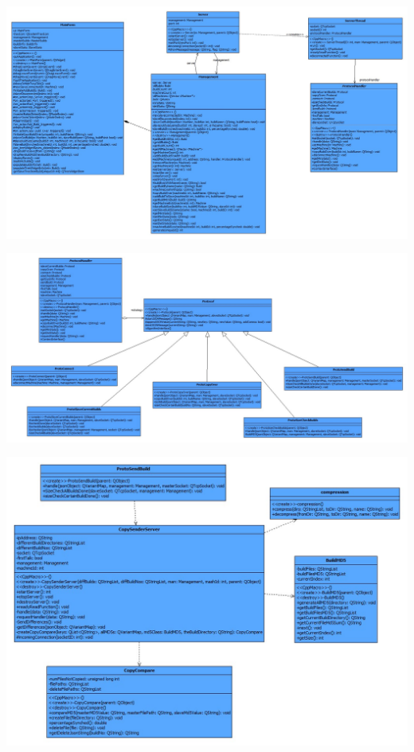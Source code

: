 \documentclass[a4paper,12pt,final]{article}
\begin{document}
\begin{center}
	\includegraphics[angle = 90,scale = 0.45]{Server.jpg}
\end{center}
\begin{center}
	\includegraphics[angle = 90,scale = 0.45]{Protocols.jpg}
\end{center}
\begin{center}
	\includegraphics[angle = 90,scale = 0.65]{BuildCopy.jpg}
\end{center}
\end{document}
